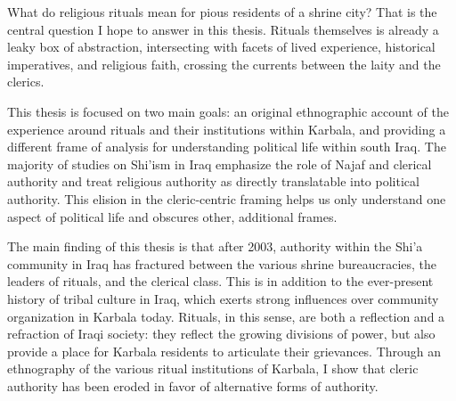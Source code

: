 
What do religious rituals mean for pious residents of a shrine city? That is the central question I hope to answer in this thesis. Rituals themselves is already a leaky box of abstraction, intersecting with facets of lived experience, historical imperatives, and religious faith, crossing the currents between the laity and the clerics.  


This thesis is focused on two main goals: an original ethnographic account of the experience around rituals and their institutions within Karbala, and providing a different frame of analysis for understanding political life within south Iraq. The majority of studies on Shi'ism in Iraq emphasize the role of Najaf and clerical authority and treat religious authority as directly translatable into political authority. This elision in the cleric-centric framing helps us only understand one aspect of political life and obscures other, additional frames. 

The main finding of this thesis is that after 2003, authority within the Shi'a community in Iraq has fractured between the various shrine  bureaucracies, the leaders of rituals, and the clerical class. This is in addition to the ever-present history of tribal culture in Iraq, which exerts strong influences over community organization in Karbala today. Rituals, in this sense, are both a reflection and a refraction of Iraqi society: they reflect the growing divisions of power, but also provide a place for Karbala residents to articulate their grievances. Through an ethnography of the various ritual institutions of Karbala, I show that cleric authority has been eroded in favor of alternative forms of authority. 


